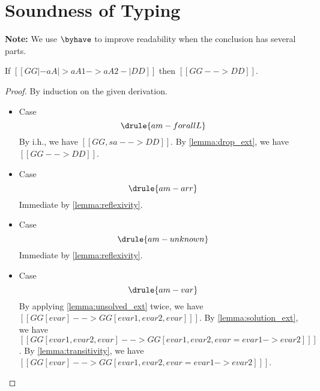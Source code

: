 \newpage

\section{Soundness of Typing}

\textbf{Note:} We use $\byhave$ to improve readability when the conclusion has several parts.


\begin{lemma}   \label{lemma:match_extension}
  If $[[  GG |- aA |> aA1 -> aA2 -| DD]]$ then $ [[GG --> DD]]  $.
\end{lemma}
\begin{proof}
  By induction on the given derivation.
  \begin{itemize}
  \item Case \[ \drule{am-forallL} \]
    By i.h., we have $[[ GG, sa --> DD  ]]$. By \cref{lemma:drop_ext}, we have $[[GG --> DD]]$.

  \item Case \[  \drule{am-arr}  \] Immediate by \cref{lemma:reflexivity}.

  \item Case \[ \drule{am-unknown}   \] Immediate by \cref{lemma:reflexivity}.

  \item Case \[ \drule{am-var} \]
    By applying \cref{lemma:unsolved_ext} twice, we have
    $ [[ GG[evar] --> GG[evar1, evar2, evar]  ]]   $. By
    \cref{lemma:solution_ext}, we have $[[ GG[evar1, evar2, evar] --> GG[evar1, evar2, evar = evar1 -> evar2]  ]]$. By
    \cref{lemma:transitivity}, we have $[[ GG[evar] --> GG[evar1, evar2, evar = evar1 -> evar2]  ]]$.
  \end{itemize}

\end{proof}



